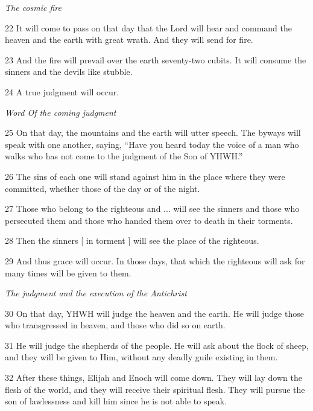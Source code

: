 \par \textit{The cosmic fire}

\par 22 It will come to pass on that day that the Lord will hear and command the heaven and the earth with great wrath. And they will send for fire.

\par 23 And the fire will prevail over the earth seventy-two cubits. It will consume the sinners and the devils like stubble.

\par 24 A true judgment will occur.

\par \textit{Word Of the coming judgment}

\par 25 On that day, the mountains and the earth will utter speech. The byways will speak with one another, saying, “Have you heard today the voice of a man who walks who has not come to the judgment of the Son of YHWH.”

\par 26 The sins of each one will stand against him in the place where they were committed, whether those of the day or of the night.

\par 27 Those who belong to the righteous and ... will see the sinners and those who persecuted them and those who handed them over to death in their torments.

\par 28 Then the sinners [ in torment ] will see the place of the righteous.

\par 29 And thus grace will occur. In those days, that which the righteous will ask for many times will be given to them.

\par \textit{The judgment and the execution of the Antichrist}

\par 30 On that day, YHWH will judge the heaven and the earth. He will judge those who transgressed in heaven, and those who did so on earth.

\par 31 He will judge the shepherds of the people. He will ask about the flock of sheep, and they will be given to Him, without any deadly guile existing in them.

\par 32 After these things, Elijah and Enoch will come down. They will lay down the flesh of the world, and they will receive their spiritual flesh. They will pursue the son of lawlessness and kill him since he is not able to speak.

